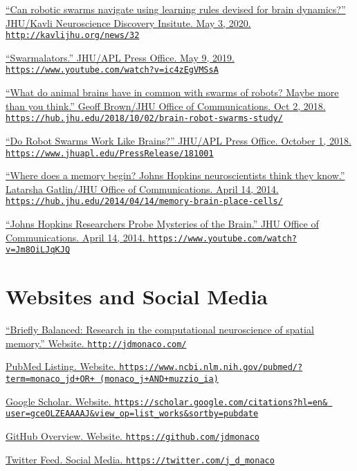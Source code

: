 \documentclass[10pt]{article}
\newcommand{\itemtitle}[1]{{\color{hopkinsblue}\ul{#1}}}
\newcommand{\aurl}[1]{{\color{dimgray}\texttt{#1}}}
\begin{document}
\begin{description}
  \item \href{http://kavlijhu.org/news/32} {``\itemtitle{Can
        robotic swarms navigate using learning rules devised for brain
      dynamics?}'' JHU/Kavli Neuroscience Discovery Insitute. May 3, 2020.
    \aurl{http://kavlijhu.org/news/32}}
  \item \href{https://www.youtube.com/watch?v=ic4zEgVMSsA}
    {``\itemtitle{Swarmalators}.'' JHU/APL Press Office. May 9, 2019.
    \aurl{https://www.youtube.com/watch?v=ic4zEgVMSsA}}
  \item \href{https://hub.jhu.edu/2018/10/02/brain-robot-swarms-study/}
    {``\itemtitle{What do animal brains have in common with swarms of robots?
      Maybe more than you think}.'' Geoff Brown/JHU Office of Communications. Oct 2,
    2018. \aurl{https://hub.jhu.edu/2018/10/02/brain-robot-swarms-study/}}
  \item \href{https://www.jhuapl.edu/PressRelease/181001}
    {``\itemtitle{Do Robot Swarms Work Like Brains?}'' JHU/APL Press Office. October 1, 2018.
    \aurl{https://www.jhuapl.edu/PressRelease/181001}}
  \item \href{https://hub.jhu.edu/2014/04/14/memory-brain-place-cells/}
    {``\itemtitle{Where does a memory begin? Johns Hopkins neuroscientists think they
      know}.'' Latarsha Gatlin/JHU Office of Communications. April 14, 2014.
    \aurl{https://hub.jhu.edu/2014/04/14/memory-brain-place-cells/}}
  \item \href{https://www.youtube.com/watch?v=Jm8OiLJqKJQ}
    {``\itemtitle{Johns Hopkins Researchers Probe Mysteries of
      the Brain}.'' JHU Office of Communications. April 14, 2014.
    \aurl{https://www.youtube.com/watch?v=Jm8OiLJqKJQ}}
\end{description}

\section*{Websites and Social Media}

\begin{description}
  \item \href{http://jdmonaco.com/}
    {``\itemtitle{Briefly Balanced: Research in the computational neuroscience
    of spatial memory}.” Website. \aurl{http://jdmonaco.com/}}
  \item \href{https://www.ncbi.nlm.nih.gov/pubmed/?term=monaco_jd+OR+(monaco_j+AND+muzzio_ia)}
    {\itemtitle{PubMed Listing}. Website. \aurl{https://www.ncbi.nlm.nih.gov/pubmed/?term=monaco\_jd+OR+ (monaco\_j+AND+muzzio\_ia)}}
  \item \href{http://jdmonaco.com/google-scholar}
    {\itemtitle{Google Scholar}. Website. \aurl{https://scholar.google.com/citations?hl=en\& user=gceOLZEAAAAJ\&view\_op=list\_works\&sortby=pubdate}}
  \item \href{https://github.com/jdmonaco}
    {\itemtitle{GitHub Overview}. Website. \aurl{https://github.com/jdmonaco}}
  \item \href{https://twitter.com/j_d_monaco}
    {\itemtitle{Twitter Feed}. Social Media. \aurl{https://twitter.com/j\_d\_monaco}}
\end{description}
\end{document}
